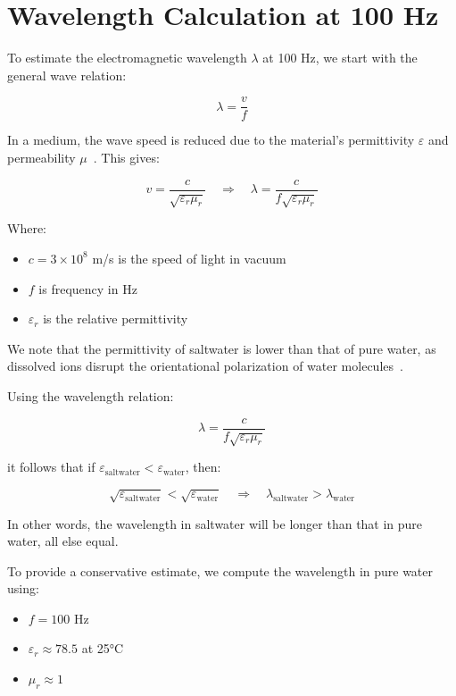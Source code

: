 \section{Wavelength Calculation at 100 Hz}
\label{appendix:wavelength}

To estimate the electromagnetic wavelength $\lambda$ at 100 Hz, we start with the general wave relation:

\[
\lambda = \frac{v}{f}
\]

In a medium, the wave speed is reduced due to the material's permittivity \( \varepsilon \) and permeability \( \mu \)~\cite{griffiths-2013}. This gives:

\[
v = \frac{c}{\sqrt{\varepsilon_r \mu_r}}
\quad \Rightarrow \quad
\lambda = \frac{c}{f \sqrt{\varepsilon_r \mu_r}}
\]

Where:
\begin{itemize}
  \item $c = 3 \times 10^8$ m/s is the speed of light in vacuum
  \item $f$ is frequency in Hz
  \item $\varepsilon_r$ is the relative permittivity
  
\end{itemize}

We note that the permittivity of saltwater is lower than that of pure water, as dissolved ions disrupt the orientational polarization of water molecules~\cite{hasted-1948,gavish-2016}.

Using the wavelength relation:

\[
\lambda = \frac{c}{f \sqrt{\varepsilon_r \mu_r}}
\]

it follows that if $\varepsilon_{\text{saltwater}} < \varepsilon_{\text{water}}$, then:

\[
\sqrt{\varepsilon_{\text{saltwater}}} < \sqrt{\varepsilon_{\text{water}}} \quad \Rightarrow \quad \lambda_{\text{saltwater}} > \lambda_{\text{water}}
\]

In other words, the wavelength in saltwater will be longer than that in pure water, all else equal.

To provide a conservative estimate, we compute the wavelength in pure water using:

\begin{itemize}
  \item $f = 100$ Hz
  \item $\varepsilon_r \approx 78.5$ at 25°C~\cite{malmberg-1956}
  \item $\mu_r \approx 1$~\cite{america-no-date}
\end{itemize}

